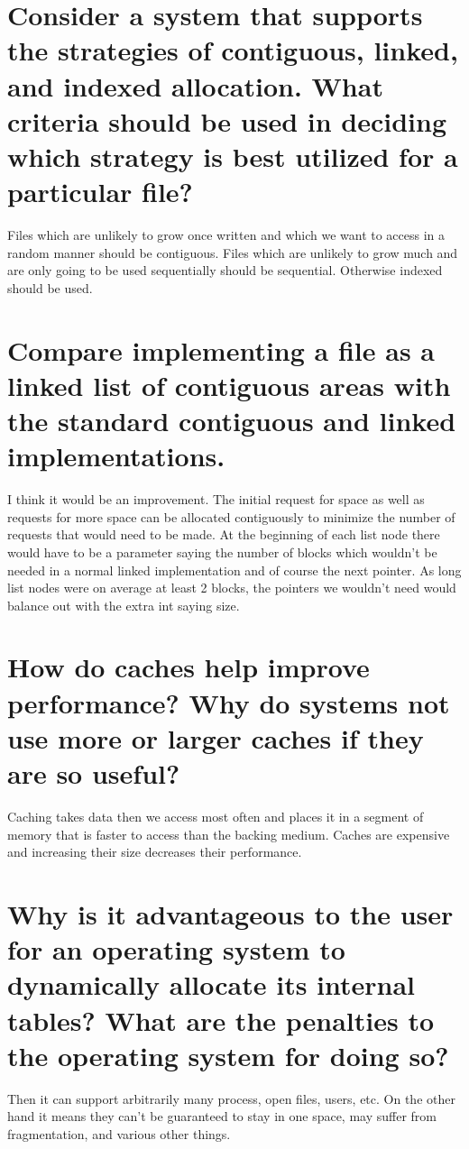 \documentclass{book}%
\begin{document}
\section{Consider a system that supports the strategies of contiguous, linked, and indexed allocation. What criteria should be used in deciding which strategy is best utilized for a particular file?}
Files which are unlikely to grow once written and which we want to access in a random manner should be contiguous. Files which are unlikely to grow much and are only going to be used sequentially should be sequential. Otherwise indexed should be used.
\section{Compare implementing a file as a linked list of contiguous areas with the standard contiguous and linked implementations.}
I think it would be an improvement. The initial request for space as well as requests for more space can be allocated contiguously to minimize the number of requests that would need to be made. At the beginning of each list node there would have to be a parameter saying the number of blocks which wouldn't be needed in a normal linked implementation and of course the next pointer. As long list nodes were on average at least 2 blocks, the pointers we wouldn't need would balance out with the extra int saying size.
\section{How do caches help improve performance? Why do systems not use more or larger caches if they are so useful?}
Caching takes data then we access most often and places it in a segment of memory that is faster to access than the backing medium. Caches are expensive and increasing their size decreases their performance.
\section{Why is it advantageous to the user for an operating system to dynamically allocate its internal tables? What are the penalties to the operating system for doing so?}
Then it can support arbitrarily many process, open files, users, etc. On the other hand it means they can't be guaranteed to stay in one space, may suffer from fragmentation, and various other things.
\end{document}

